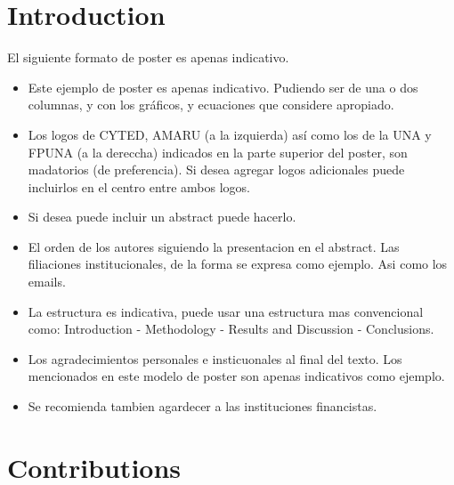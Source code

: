 \documentclass[portrait]{Hylangtechposter}
\begin{document}
\begin{multicols}{2} %

  \color{black}
  
\section*{Introduction}

El siguiente formato de poster es apenas indicativo. 

\begin{itemize}

    \item Este ejemplo de poster es apenas indicativo. Pudiendo ser de una o dos columnas, y con los gr\'aficos, y ecuaciones que considere apropiado.  

    \item Los logos de CYTED, AMARU (a la izquierda) as\'i como los de la UNA y FPUNA (a la dereccha) indicados en la parte superior del poster, son madatorios (de preferencia). Si desea agregar logos adicionales puede incluirlos en el centro entre ambos logos. 

    \item Si desea puede incluir un abstract puede hacerlo.

    \item El orden de los autores siguiendo la presentacion en el abstract. Las filiaciones institucionales, de la forma se expresa como ejemplo. Asi como los emails. 

    \item La estructura es indicativa, puede usar una estructura mas convencional como: Introduction - Methodology - Results and Discussion - Conclusions. 

    \item Los agradecimientos personales e insticuonales al final del texto. Los mencionados en este modelo de poster son apenas indicativos como ejemplo. 
    
    \item Se recomienda tambien agardecer a las instituciones financistas. 
    
\end{itemize}

\section*{Contributions}



\end{multicols}
\end{document}
